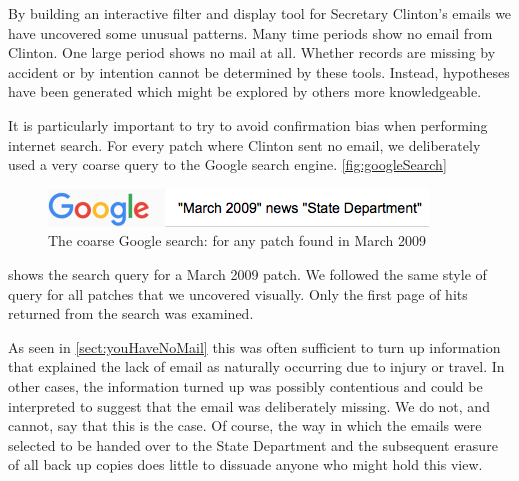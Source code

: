 \documentclass[journal]{vgtc}                %
\begin{document}
By building an interactive filter and display tool for Secretary Clinton's emails we have uncovered some unusual patterns.  Many time periods show no email from Clinton.  One large period shows no mail at all.  Whether records are missing by accident or by intention cannot be determined by these tools. 
Instead, hypotheses have been generated which might be explored by others more knowledgeable.

It is particularly important to try to avoid confirmation bias when performing internet search.  For every patch where Clinton sent no email, we deliberately used a very coarse query to the Google search engine.   
\autoref{fig:googleSearch}
\begin{figure}[h]
\begin{center}
\includegraphics[width=0.75\linewidth]{googleSearch}
\caption{The coarse Google search: for any patch found in March 2009}
\label{fig:googleSearch}
\end{center}
\end{figure}
shows the search query for a March 2009 patch.  We followed the same style of query for all patches that we uncovered visually.  Only the first page of hits returned from the search was examined.

As seen in \autoref{sect:youHaveNoMail} this was often sufficient to turn up information that explained the lack of email as naturally occurring due to injury or travel.  In other cases, the information turned up was possibly contentious and could be interpreted to suggest that the email was deliberately missing.  We do not, and cannot, say that this is the case.  Of course, the way in which the emails were selected to be handed over to the State Department and the subsequent erasure of all back up copies does little to dissuade anyone who might hold this view.
\end{document}

